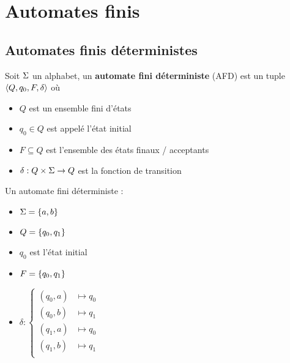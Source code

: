 
\section{Automates finis}

\subsection{Automates finis déterministes}

\begin{definition}
	Soit $\Sigma$ un alphabet, un \textbf{automate fini déterministe} (AFD) est un tuple $\langle Q, q_0, F, \delta \rangle$ où
	\begin{itemize}
		\item $Q$ est un ensemble fini d'états
		\item $q_0 \in Q$ est appelé l'état initial
		\item $F \subseteq Q$ est l'ensemble des états finaux / acceptants
		\item $\delta : Q \times \Sigma \to Q$ est la fonction de transition
	\end{itemize}
\end{definition}


\begin{exemple} Un automate fini déterministe :

	\vspace{0.5cm}
	\begin{minipage}{0.5\textwidth}
		\begin{itemize}
			\item $\Sigma = \left\{a, b\right\}$
			\item $Q = \left\{q_0, q_1\right\}$
			\item $q_0$ est l'état initial
			\item $F = \left\{q_0, q_1\right\}$
			\item $\delta :
				      \left\{
				      \begin{array}{cc}
					      (q_0, a) & \mapsto q_0 \\
					      (q_0, b) & \mapsto q_1 \\
					      (q_1, a) & \mapsto q_0 \\
					      (q_1, b) & \mapsto q_1 \\
				      \end{array}
				      \right.$
		\end{itemize}
	\end{minipage}
	\begin{minipage}{0.5\textwidth}
	\end{minipage}
\end{exemple}

